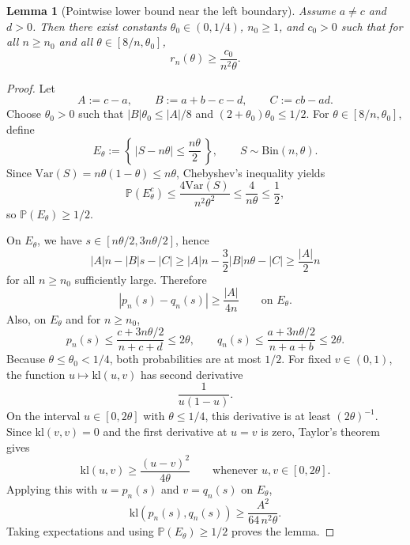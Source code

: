 \documentclass{article}
\newtheorem{lemma}[theorem]{Lemma}
\theoremstyle{definition}
\theoremstyle{remark}
\newcommand{\Pbb}{\mathbb{P}}
\newcommand{\Bin}{\mathrm{Bin}}
\newcommand{\Var}{\mathrm{Var}}
\newcommand{\klb}{\mathrm{kl}}
\begin{document}
\begin{lemma}[Pointwise lower bound near the left boundary]
\label{lem:left-lower}
Assume $a\neq c$ and $d>0$. Then there exist constants $\theta_0\in(0,1/4)$, $n_0\ge 1$, and $c_0>0$ such that for all $n\ge n_0$ and all $\theta\in[8/n,\theta_0]$,
\[
r_n(\theta) \ge \frac{c_0}{n^2\theta}.
\]
\end{lemma}

\begin{proof}
Let
\[
A:=c-a,
\qquad
B:=a+b-c-d,
\qquad
C:=cb-ad.
\]
Choose $\theta_0>0$ such that $|B|\theta_0 \le |A|/8$ and $(2+\theta_0)\theta_0\le 1/2$. For $\theta\in[8/n,\theta_0]$, define
\[
E_\theta := \left\{\,|S-n\theta|\le \frac{n\theta}{2}\,\right\},
\qquad S\sim \Bin(n,\theta).
\]
Since $\Var(S)=n\theta(1-\theta)\le n\theta$, Chebyshev's inequality yields
\[
\Pbb(E_\theta^c)
\le
\frac{4\Var(S)}{n^2\theta^2}
\le
\frac{4}{n\theta}
\le
\frac{1}{2},
\]
so $\Pbb(E_\theta)\ge 1/2$.

On $E_\theta$, we have $s\in[n\theta/2,3n\theta/2]$, hence
\[
|A|n-|B|s-|C|
\ge
|A|n - \frac{3}{2}|B|n\theta - |C|
\ge
\frac{|A|}{2}n
\]
for all $n\ge n_0$ sufficiently large. Therefore
\[
|p_n(s)-q_n(s)|
\ge
\frac{|A|}{4n}
\qquad\text{on }E_\theta.
\]
Also, on $E_\theta$ and for $n\ge n_0$,
\[
p_n(s)\le \frac{c+3n\theta/2}{n+c+d}\le 2\theta,
\qquad
q_n(s)\le \frac{a+3n\theta/2}{n+a+b}\le 2\theta.
\]
Because $\theta\le\theta_0<1/4$, both probabilities are at most $1/2$. For fixed $v\in(0,1)$, the function $u\mapsto \klb(u,v)$ has second derivative
\[
\frac{1}{u(1-u)}.
\]
On the interval $u\in[0,2\theta]$ with $\theta\le 1/4$, this derivative is at least $(2\theta)^{-1}$. Since $\klb(v,v)=0$ and the first derivative at $u=v$ is zero, Taylor's theorem gives
\[
\klb(u,v)\ge \frac{(u-v)^2}{4\theta}
\qquad\text{whenever }u,v\in[0,2\theta].
\]
Applying this with $u=p_n(s)$ and $v=q_n(s)$ on $E_\theta$,
\[
\klb(p_n(s),q_n(s))
\ge
\frac{A^2}{64\,n^2\theta}.
\]
Taking expectations and using $\Pbb(E_\theta)\ge 1/2$ proves the lemma.
\end{proof}
\end{document}
